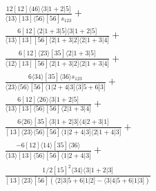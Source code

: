\documentclass[varwidth, border=5pt]{standalone}
\begin{document}
\begin{my}
$\begin{gathered}
\scriptscriptstyle\frac{12[12]⟨46⟩⟨3|1+2|5]}{⟨13⟩[13]⟨56⟩[56]s_{123}}+\\
\scriptscriptstyle\frac{6[12]⟨2|1+3|5]⟨3|1+2|5]}{⟨13⟩[13][56]⟨2|1+3|2]⟨2|1+3|4]}+\\
\scriptscriptstyle\frac{6[12]⟨23⟩[35]⟨2|1+3|5]}{⟨12⟩[13][56]⟨2|1+3|2]⟨2|1+3|4]}+\\
\scriptscriptstyle\frac{6⟨34⟩[35]⟨36⟩s_{123}}{⟨23⟩⟨56⟩[56]⟨1|2+4|3]⟨3|5+6|3]}+\\
\scriptscriptstyle\frac{6[12]⟨26⟩⟨3|1+2|5]}{⟨13⟩[13]⟨56⟩[56]⟨2|1+3|4]}+\\
\scriptscriptstyle\frac{6⟨26⟩[35]⟨3|1+2|3]⟨4|2+3|1]}{[13]⟨23⟩⟨56⟩[56]⟨1|2+4|3]⟨2|1+4|3]}+\\
\scriptscriptstyle\frac{-6[12]⟨14⟩[35]⟨36⟩}{⟨13⟩[13]⟨56⟩[56]⟨1|2+4|3]}+\\
\scriptscriptstyle\frac{1/2[15]^2⟨34⟩⟨3|1+2|3]}{[13]⟨23⟩[56](⟨2|3|5+6|1|2]-⟨3|4|5+6|1|3])}\phantom{+}
\end{gathered}$
\end{my}
\end{document}
